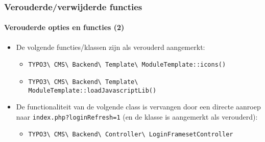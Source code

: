 
\begin{frame}[fragile]
	\frametitle{Verouderde/verwijderde functies}
	\framesubtitle{Verouderde opties en functies (2)}

	\begin{itemize}
		\item De volgende functies/klassen zijn als verouderd aangemerkt:

			\begin{itemize}\smaller
				\item \texttt{TYPO3\textbackslash
					CMS\textbackslash
					Backend\textbackslash
					Template\textbackslash
					ModuleTemplate::icons()}

				\item \texttt{TYPO3\textbackslash
					CMS\textbackslash
					Backend\textbackslash
					Template\textbackslash
					ModuleTemplate::loadJavascriptLib()}

			\end{itemize}

		\item De functionaliteit van de volgende class is vervangen door een
			directe aanroep naar \texttt{index.php?loginRefresh=1} (en de klasse is
			aangemerkt als verouderd):

			\begin{itemize}\smaller
				\item \texttt{TYPO3\textbackslash
					CMS\textbackslash
					Backend\textbackslash
					Controller\textbackslash
					LoginFramesetController}
			\end{itemize}\smaller

	\end{itemize}

\end{frame}


